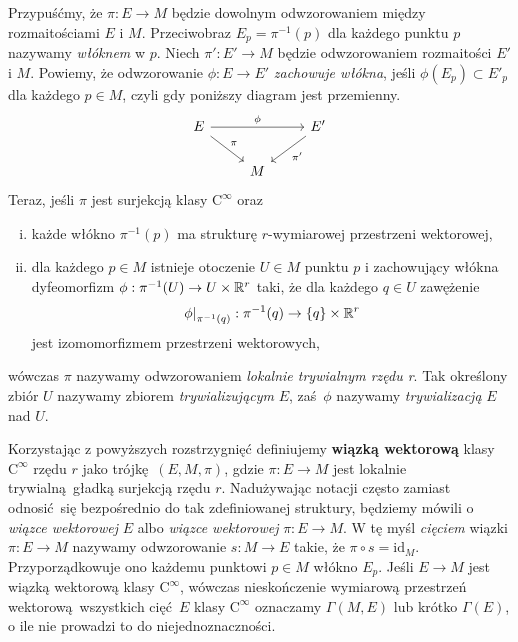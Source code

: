 Przypuśćmy, że \(\pi: E\to M\) będzie dowolnym odwzorowaniem między rozmaitościami \(E\) i \(M\). Przeciwobraz \(E_p = \pi^{-1}(p)\) dla każdego punktu \(p\) nazywamy \emph{włóknem} w \(p\). Niech \(\pi': E'\to M\) będzie odwzorowaniem rozmaitości \(E'\) i \(M\). Powiemy, że odwzorowanie \(\phi:E\to E'\) \emph{zachowuje włókna}, jeśli \(\phi(E_p)\subset E'_p\) dla każdego \(p\in M\), czyli gdy poniższy diagram jest przemienny.
\begin{equation*}
    \begin{tikzcd}
        E \arrow{dr}{\pi} \arrow{rr}{\phi} && E' \arrow{dl}{\pi'}\\
         & M 
    \end{tikzcd}
\end{equation*}
Teraz, jeśli \(\pi\) jest surjekcją klasy \(\mathrm{C}^\infty\) oraz
\begin{enumerate}[i)]
    \item każde włókno \(\pi^{-1}(p)\) ma strukturę \(r\)-wymiarowej przestrzeni wektorowej,
    \item dla każdego \(p\in M\) istnieje otoczenie \(U\in M\) punktu \(p\) i zachowujący włókna dyfeomorfizm \(\phi: \pi^{-1}(U)\to U\times \mathbb{R}^r\) taki, że dla każdego \(q\in U\) zawężenie
\begin{equation*}
\left.\phi\right|_{\pi^{-1}(q)}:\pi^{-1}(q)\to \{q\} \times \mathbb{R}^r
\end{equation*}
jest izomomorfizmem przestrzeni wektorowych,

\end{enumerate}
wówczas \(\pi\) nazywamy odwzorowaniem \emph{lokalnie trywialnym rzędu r}.  Tak określony zbiór \(U\) nazywamy zbiorem \emph{trywializującym} \(E\), zaś \(\phi\) nazywamy \emph{trywializacją} \(E\) nad \(U\).

Korzystając z powyższych rozstrzygnięć definiujemy \textbf{wiązką wektorową} klasy \(\mathrm{C}^\infty\) rzędu \(r\) jako trójkę \((E, M, \pi)\), gdzie \(\pi: E\to M\) jest lokalnie trywialną gładką surjekcją rzędu \(r\). Nadużywając notacji często zamiast odnosić się bezpośrednio do tak zdefiniowanej struktury, będziemy mówili o \emph{wiązce wektorowej} \(E\) albo \emph{wiązce wektorowej} \(\pi:E\to M\). W tę myśl \emph{cięciem} wiązki \(\pi: E\to M\) nazywamy odwzorowanie \(s:M\to E\) takie, że \(\pi\circ s= \mathrm{id}_M\). Przyporządkowuje ono każdemu punktowi \(p\in M\) włókno \(E_p\). Jeśli \(E\to M\) jest wiązką wektorową klasy \(\mathrm{C}^\infty\), wówczas nieskończenie wymiarową przestrzeń wektorową wszystkich cięć \(E\) klasy \(\mathrm{C}^\infty\) oznaczamy \(\Gamma(M, E)\) lub krótko \(\Gamma(E)\), o ile nie prowadzi to do niejednoznaczności. 

